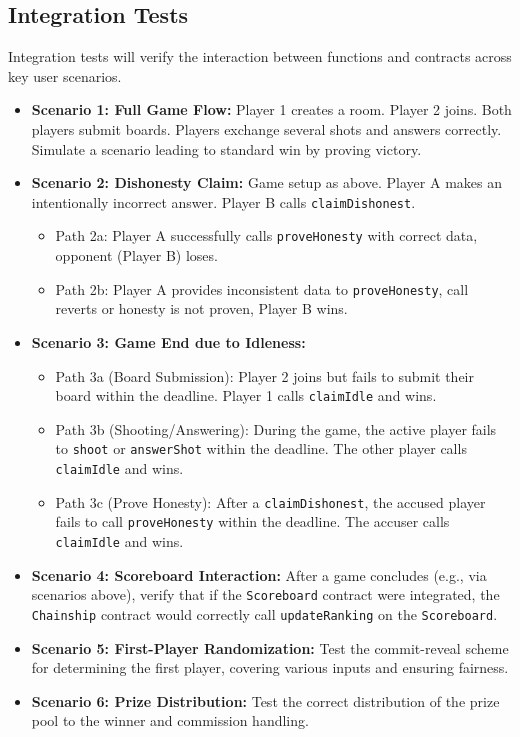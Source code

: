 \documentclass{article}
\begin{document}
    \subsection{Integration Tests}
    Integration tests will verify the interaction between functions and contracts across key user scenarios.
    \begin{itemize}
        \item \textbf{Scenario 1: Full Game Flow:}
        Player 1 creates a room. Player 2 joins. Both players submit boards. Players exchange several shots and answers correctly. Simulate a scenario leading to standard win by proving victory.
        \item \textbf{Scenario 2: Dishonesty Claim:}
        Game setup as above. Player A makes an intentionally incorrect answer. Player B calls \texttt{claimDishonest}.
        \begin{itemize}
            \item Path 2a: Player A successfully calls \texttt{proveHonesty} with correct data, opponent (Player B) loses.
            \item Path 2b: Player A provides inconsistent data to \texttt{proveHonesty}, call reverts or honesty is not proven, Player B wins.
        \end{itemize}
        \item \textbf{Scenario 3: Game End due to Idleness:}
        \begin{itemize}
            \item Path 3a (Board Submission): Player 2 joins but fails to submit their board within the deadline. Player 1 calls \texttt{claimIdle} and wins.
            \item Path 3b (Shooting/Answering): During the game, the active player fails to \texttt{shoot} or \texttt{answerShot} within the deadline. The other player calls \texttt{claimIdle} and wins.
            \item Path 3c (Prove Honesty): After a \texttt{claimDishonest}, the accused player fails to call \texttt{proveHonesty} within the deadline. The accuser calls \texttt{claimIdle} and wins.
        \end{itemize}
        \item \textbf{Scenario 4: Scoreboard Interaction:}
        After a game concludes (e.g., via scenarios above), verify that if the \texttt{Scoreboard} contract were integrated, the \texttt{Chainship} contract would correctly call \texttt{updateRanking} on the \texttt{Scoreboard}.
        \item \textbf{Scenario 5: First-Player Randomization:}
        Test the commit-reveal scheme for determining the first player, covering various inputs and ensuring fairness.
        \item \textbf{Scenario 6: Prize Distribution:}
        Test the correct distribution of the prize pool to the winner and commission handling.
    \end{itemize}
\end{document}

